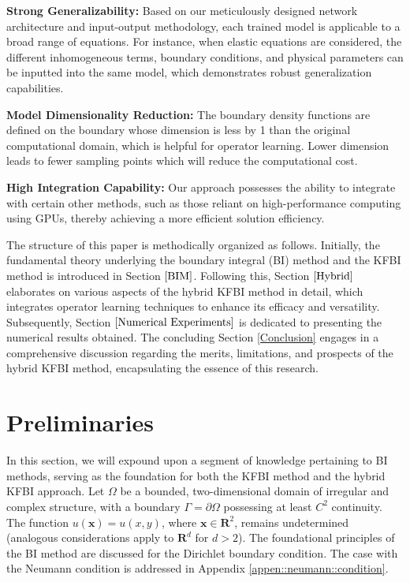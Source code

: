 \documentclass{article}
\begin{document}
\textbf{Strong Generalizability:} Based on our meticulously designed network architecture and input-output methodology, each trained model is applicable to a broad range of equations. For instance, when elastic equations are considered, the different inhomogeneous terms, boundary conditions, and physical parameters can be  inputted into the same model, which demonstrates robust generalization capabilities.

\textbf{Model Dimensionality Reduction:} The boundary density functions are defined on the boundary whose dimension is less by 1 than the original computational domain, which is helpful for operator learning. Lower dimension leads to fewer sampling points which will reduce the computational cost.

\textbf{High Integration Capability:} Our approach possesses the ability to integrate with certain other methods, such as those reliant on high-performance computing using GPUs, thereby achieving a more efficient solution efficiency.

The structure of this paper is methodically organized as follows. Initially, the fundamental theory underlying the boundary integral (BI) method and the KFBI method is introduced in Section $\ref{BIM}$. Following this, Section $\ref{Hybrid}$ elaborates on various aspects of the hybrid KFBI method in detail, which integrates operator learning techniques to enhance its efficacy and versatility. Subsequently, Section $\ref{Numerical Experiments}$ is dedicated to presenting the numerical results obtained. The concluding Section \ref{Conclusion} engages in a comprehensive discussion regarding the merits, limitations, and prospects of the hybrid KFBI method, encapsulating the essence of this research.


\section{Preliminaries} \label{BIM}
In this section, we will expound upon a segment of knowledge pertaining to BI methods, serving as the foundation for both the KFBI method and the hybrid KFBI approach. Let $\Omega$  be a bounded, two-dimensional domain of irregular and complex structure, with a boundary $\Gamma = \partial \Omega$ possessing at least $C^2$ continuity. The function $u(\mathbf{x}) = u(x, y)$, where $\mathbf{x} \in \mathbf{R}^{2}$, remains undetermined (analogous considerations apply to $\mathbf{R}^d$ for $d > 2$). The foundational principles of the BI method are discussed for the Dirichlet boundary condition. The case with the Neumann condition is addressed in Appendix \ref{appen::neumann::condition}.
\end{document}
